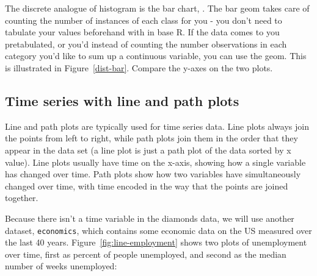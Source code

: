 The discrete analogue of histogram is the bar chart, .  The bar geom takes care of counting the number of instances of each class for you - you don't need to tabulate your values beforehand with  in base R.  If the data comes to you pretabulated, or you'd instead of counting the number observations in each category you'd like to sum up a continuous variable, you can use the  geom.  This is illustrated in Figure~\ref{dist-bar}.  Compare the y-axes on the two plots.

% 


\subsection{Time series with line and path plots}
\label{sub:line}

Line and path plots are typically used for time series data.  Line plots always join the points from left to right, while path plots join them in the order that they appear in the data set (a line plot is just a path plot of the data sorted by x value).  Line plots usually have time on the x-axis, showing how a single variable has changed over time.  Path plots show how two variables have simultaneously changed over time, with time encoded in the way that the points are joined together.

Because there isn't a time variable in the diamonds data, we will use another dataset, {\tt economics}, which contains some economic data on the US measured over the last 40 years.  Figure~\ref{fig:line-employment} shows two plots of unemployment over time, first as percent of people unemployed, and second as the median number of weeks unemployed:

% 


